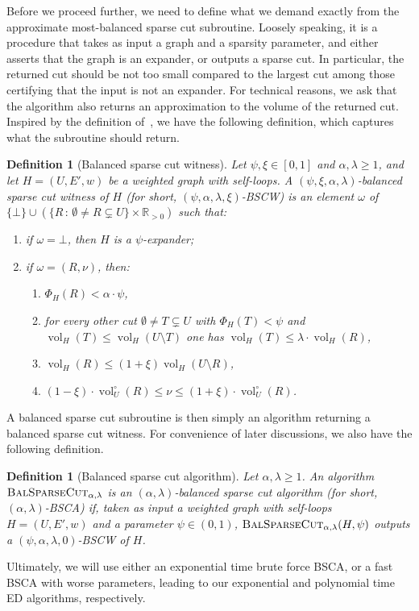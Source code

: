 \documentclass[epsfig,letter,11pt]{article}
\numberwithin{equation}{section}
\DeclareMathOperator{\vol}{vol}
\newcommand{\unvolc}[2]{\operatorname{vol}_{#2}^\circ (#1)}
\newcommand{\bsc}{\textsc{BalSparseCut}_{\alpha,\lambda}}
\newtheorem{definition}[theorem]{Definition}
\begin{document}
Before we proceed further, we need to define what we demand exactly from the approximate most-balanced sparse cut subroutine. Loosely speaking, it is a procedure that takes as input a graph and a sparsity parameter, and either asserts that the graph is an expander, or outputs a sparse cut. In particular, the returned cut should be not too small compared to the largest cut among those certifying that the input is not an expander. For technical reasons, we ask that the algorithm also returns an approximation to the volume of the returned cut. Inspired by the definition of~\cite{streamexpdec}, we have the following definition, which captures what the subroutine should return.

\begin{definition}[Balanced sparse cut witness]
	\label{def:bscw}
	Let $\psi, \xi \in [0,1]$ and $\alpha,\lambda \ge 1$, and let $H=(U,E',w)$ be a weighted graph with self-loops. A $(\psi,\xi,\alpha,\lambda)$-balanced sparse cut witness of $H$ (for short, $(\psi,\alpha,\lambda,\xi)$-BSCW) is an element $\omega$ of $\{\bot\} \cup (\{R\,:\,\emptyset \neq R \subsetneq U\} \times \mathbb{R}_{>0})$ such that:
	\begin{enumerate}
		\item \label{item:expr} if $\omega = \bot$, then $H$ is a $\psi$-expander;
		\item if $\omega = (R,\nu)$, then:
		\begin{enumerate}
			\item \label{item:sparser} $\Phi_{H}(R) < \alpha \cdot \psi $,
			\item \label{item:balr} for every other cut $\emptyset \neq T \subsetneq U$ with $\Phi_H(T) <  \psi$ and $\vol_H(T) \le \vol_H(U \setminus T)$ one has $\vol_H(T) \le \lambda\cdot \vol_H(R)$,
			\item \label{item:smallsider} $\vol_H(R) \le (1+\xi) \vol_H(U \setminus R)$,
			\item \label{item:goodestimr} $ (1-\xi)  \cdot \unvolc{R}{U} \le \nu \le  (1+\xi)  \cdot \unvolc{R}{U}$.
		\end{enumerate}
	\end{enumerate}
\end{definition}
\noindent
A balanced sparse cut subroutine is then simply an algorithm returning a balanced sparse cut witness. For convenience of later discussions, we also have the following definition.

\begin{definition}[Balanced sparse cut algorithm]
	\label{def:bsca}
	Let $\alpha,\lambda \ge 1$. An algorithm $\bsc$ is an $(\alpha, \lambda)$-balanced sparse cut algorithm (for short, $(\alpha,\lambda)$-BSCA) if, taken as input a weighted graph with self-loops $H=(U,E',w)$ and a parameter $\psi \in (0,1)$, $\bsc(H,\psi)$ outputs a $(\psi,\alpha,\lambda,0)$-BSCW of $H$.
\end{definition}
\noindent
Ultimately, we will use either an exponential time brute force BSCA, or a fast BSCA with worse parameters, leading to our exponential and polynomial time ED algorithms, respectively.
\end{document}
